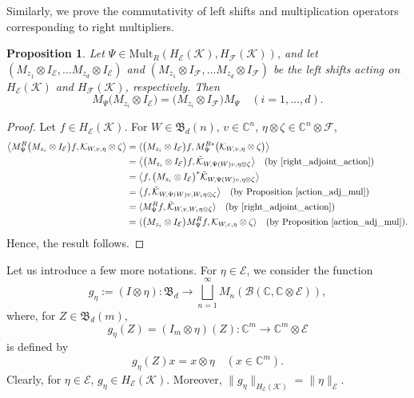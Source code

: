 \documentclass[12pt]{amsart}%
\newtheorem{proposition}[theorem]{Proposition}
\numberwithin{equation}{section}
\newcommand{\fB}{{\mathfrak{B}}}
\newcommand{\clb}{\mathcal{B}}
\newcommand{\cle}{\mathcal{E}}
\newcommand{\clf}{\mathcal{F}}
\newcommand{\clk}{\mathcal{K}}
\newcommand{\C}{\mathbb{C}}
\newcommand\la{{\langle }}
\newcommand\ra{{\rangle}}
\begin{document}
Similarly, we prove the commutativity of left shifts and multiplication operators corresponding to right multipliers.
\begin{proposition}\label{Right_mult_and_shift}
Let $\Psi\in \text{Mult}_R(H_\cle(\clk), H_\clf(\clk))$, and let $(M_{z_1} \otimes I_{\cle}, \ldots M_{z_d}\otimes I_{\cle})$ and $(M_{z_1} \otimes I_{\clf}, \ldots M_{z_d}\otimes I_{\clf})$ be the left shifts acting on $H_\cle(\clk)$ and $H_\clf(\clk)$, respectively. Then
\[
M_\Psi \big (M_{z_i} \otimes I_{\cle}\big)= \big(M_{z_i} \otimes I_{\clf}\big) M_\Psi \quad (i=1, \ldots, d).
\]
\end{proposition}

\begin{proof}
Let $f\in H_\cle(\clk)$. For $W\in\fB_d(n)$, $v\in \C^n$, $\eta \otimes \zeta \in \C^n\otimes \clf$,
\begingroup
 \allowdisplaybreaks
\begin{align*}
\big \langle M^R_\Psi \big (M_{z_i}  \otimes I_{\cle}\big)f, \clk_{W, v, \eta}\otimes \zeta\big\rangle &= \la \big ( M_{z_i} \otimes I_{\cle}\big) f, M^{R*}_\Psi \big( \clk_{W,v, \eta}\otimes \zeta\big )\big\rangle \\
&= \big \langle \big ( M_{z_i} \otimes I_{\cle}\big) f, \Tilde{\clk}_{W,\Psi(W)v, \eta\otimes \zeta}\big\rangle\quad (\text{by \eqref{right_adjoint_action}})\\
&= \big \langle f,  \big ( M_{z_i} \otimes I_{\cle}\big)^* \Tilde{\clk}_{W,\Psi(W)v, \eta\otimes \zeta}\big\rangle \\
&= \big \langle f,   \Tilde{\clk}_{W,\Psi(W)v, W_i\eta\otimes \zeta}\big\rangle\quad (\text{by Proposition }\ref{action_adj_mul})\\
&= \la M^R_{\Psi}f,   \Tilde{\clk}_{W, v, W_i\eta\otimes \zeta}\ra\quad (\text{by \eqref{right_adjoint_action}})\\
&= \la \big (M_{z_i}  \otimes I_{\cle}\big)M^R_{\Psi}f,  \clk_{W, v, \eta}\otimes \zeta\ra\quad (\text{by Proposition }\ref{action_adj_mul}).
\end{align*}
\endgroup
Hence, the result follows.
\end{proof}

Let us introduce a few more notations. For $\eta\in \cle$, we consider the function 
$$g_\eta:=(I\otimes \eta):\fB_d \to \bigsqcup_{n=1}^\infty M_n(\clb(\C, \C\otimes \cle)),$$ 
where, for $Z\in \fB_d(m)$,
\[g_\eta(Z)= (I_m\otimes \eta)(Z):\C^m \to \C^m \otimes \cle\]
is defined by 
\[g_\eta(Z)x= x\otimes \eta \quad (x\in\C^m).\]
Clearly, for $\eta\in \cle$, $g_\eta\in H_\cle(\clk)$. Moreover, $\|g_\eta\|_{H_\cle(\clk)}=\|\eta\|_\cle$. 
\end{document}
